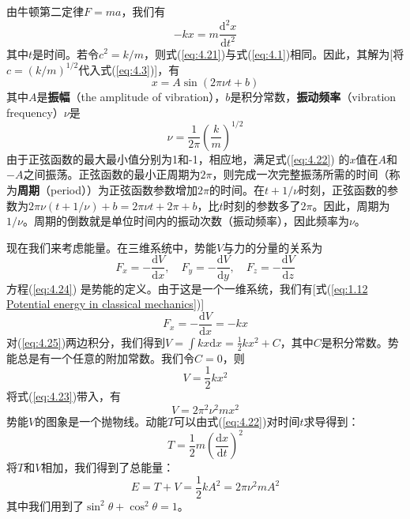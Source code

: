     由牛顿第二定律$F = ma$，我们有
    \begin{equation}
        - kx = m\frac{\mathrm{d}^2x}{\mathrm{d}t^2}
        \label{eq:4.21}
    \end{equation}
    其中$t$是时间。若令$c^2 = k/m$，则式(\ref{eq:4.21})与式(\ref{eq:4.1})相同。因此，其解为[将$c = \left(k/m\right)^{1/2}$代入式(\ref{eq:4.3})]，有
    \begin{equation}
        x = A \sin\left(2\pi \nu t +b\right)
        \label{eq:4.22}
    \end{equation}
    其中$A$是\textbf{振幅}（the amplitude of vibration），$b$是积分常数，\textbf{振动频率}（vibration frequency）$\nu$是
    \begin{equation}
        \boxed{
            \nu = \frac{1}{2\pi}\left(\frac{k}{m}\right)^{1/2}
        }
        \label{eq:4.23}
    \end{equation}
    由于正弦函数的最大最小值分别为1和-1，相应地，满足式(\ref{eq:4.22}) 的$x$值在$A$和$-A$之间振荡。正弦函数的最小正周期为$2\pi$，则完成一次完整振荡所需的时间（称为\textbf{周期}（period））为正弦函数参数增加$2\pi$的时间。在$t+1/\nu$时刻，正弦函数的参数为$2\pi \nu \left(t+1/\nu\right) + b = 2\pi \nu t + 2\pi + b$，比$t$时刻的参数多了$2\pi$。因此，周期为$1/\nu$。周期的倒数就是单位时间内的振动次数（振动频率），因此频率为$\nu$。

    现在我们来考虑能量。在三维系统中，势能$V$与力的分量的关系为
    \begin{equation}
        \boxed{
            F_x = -\frac{\mathrm{d}V}{\mathrm{d}x}, \quad F_y = -\frac{\mathrm{d}V}{\mathrm{d}y}, \quad F_z = -\frac{\mathrm{d}V}{\mathrm{d}z}
        }
        \label{eq:4.24}
    \end{equation}
    方程(\ref{eq:4.24}) 是势能的定义。由于这是一个一维系统，我们有[式(\ref{eq:1.12 Potential energy in classical mechanics})]
    \begin{equation}
        F_x = -\frac{\mathrm{d}V}{\mathrm{d}x} = -kx
        \label{eq:4.25}
    \end{equation}
    对(\ref{eq:4.25})两边积分，我们得到$V = \int kx \mathrm{d}x = \frac{1}{2}kx^2 + C$，其中$C$是积分常数。势能总是有一个任意的附加常数。我们令$C = 0$，则
    \begin{equation}
        \boxed{
            V = \frac{1}{2}kx^2
        }
        \label{eq:4.26}
    \end{equation}
    将式(\ref{eq:4.23})带入，有
    \begin{equation}
        V = 2\pi^2 \nu^2 m x^2
        \label{eq:4.27}
    \end{equation}
    势能$V$的图象是一个抛物线。动能$T$可以由式(\ref{eq:4.22})对时间$t$求导得到：
    \begin{equation}
        T = \frac{1}{2}m\left(\frac{\mathrm{d}x}{\mathrm{d}t}\right)^2
        \label{eq:4.28}
    \end{equation}
    将$T$和$V$相加，我们得到了总能量：
    \begin{equation}
        E = T + V = \frac{1}{2}kA^2 = 2\pi\nu^2mA^2
        \label{eq:4.29}
    \end{equation}
    其中我们用到了$\sin^2\theta + \cos^2\theta = 1$。


